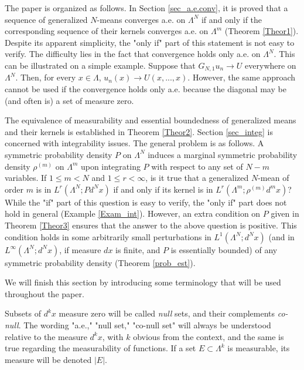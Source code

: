 \documentclass[12pt,leqno]{amsart}
\numberwithin{equation}{section}
\numberwithin{theor}{section}
\numberwithin{rem}{section}
\begin{document}
The paper is organized as follows.  In Section \ref{sec_a.e.conv}, it is proved that a sequence of generalized 
$N$-means converges a.e. on $\Lambda^N$ if and only if 
the corresponding sequence of their kernels converges 
a.e. on $\Lambda^m$ (Theorem \ref{Theor1}).  Despite its apparent simplicity, the 
"only if" part of this statement is not easy to verify.  The difficulty lies in the fact that convergence holds only a.e. on 
$\Lambda^N$.  This can be illustrated on a simple example.     
Suppose that $G_{N,1} u_n\rightarrow U$ everywhere on 
$\Lambda^N$.  Then, for every $x\in\Lambda$, $u_n(x)\rightarrow U(x,...,x)$.  However, the same approach cannot 
be used if the convergence holds only a.e. because the diagonal may be (and often is) a set of measure zero.

The equivalence of measurability and essential boundedness of generalized means and their kernels is established in Theorem \ref{Theor2}.  Section 
\ref{sec_integ} is 
concerned with integrability issues.  The general problem is 
as follows.  A symmetric probability density $P$ on 
$\Lambda^N$ induces a marginal symmetric probability 
density $\rho^{(m)}$ on $\Lambda^m$ upon integrating $P$ 
with respect to any set of $N-m$ variables.  If $1\leq m<N$  and $1\leq r<\infty$, is it true that a generalized $N$-mean 
of order $m$ is in $L^{r}(\Lambda^N; Pd^{N}x)$ if and only if 
its kernel is in $L^{r}(\Lambda^m; \rho^{(m)}d^{m}x)$?  While the "if" part of this question is easy to verify, the "only if" part does not hold in general (Example \ref{Exam_int}).  However, an extra condition on $P$ given in  Theorem \ref{Theor3} ensures that the answer to the above question is positive.  This condition holds in some arbitrarily 
small perturbations in $L^{1}(\Lambda^{N}; d^{N}x)$ (and in 
$L^{\infty}(\Lambda^{N}; d^{N}x)$, if measure $dx$ is finite, and $P$ is essentially bounded) of any symmetric probability density (Theorem \ref{prob_est}).    
 
We will finish this section by introducing some terminology that will be used throughout the paper.   

Subsets of $d^{k} x$ measure zero will be called \textit{null} 
sets, and their complements \textit{co-null}.  The wording "a.e.," "null set," "co-null set" will always be understood relative to the measure $d^{k}x$, with $k$ obvious from the context, and the same is true regarding the measurability of functions.  
If a set $E\subset \Lambda^k$ is measurable, its measure  
will be denoted $\left | E \right | $.  
\end{document}
